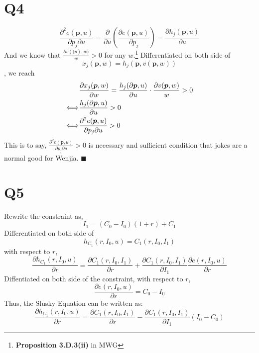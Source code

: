 \documentclass{article}
\begin{document}
\section{Q4}
\begin{equation}
	\frac{\partial^2 e(\bm{p},u)}{\partial p_{j} \partial u} = \frac{\partial}{\partial u}(\frac{\partial e(\bm{p},u)}{\partial p_{j}}) = \frac{\partial h_j(\bm{p},u)}{\partial u}
\end{equation}
And we know that $\frac{\partial v(\bm(p),w)}{w}>0$ for any $w$.\footnote{{\bf Proposition 3.D.3(ii)} in MWG}
Differentiated on both side of 
\begin{equation}
	x_j (\bm{p},w) = h_j (\bm{p}, v(\bm{p},w))
\end{equation}
, we reach
\begin{align}	\notag
	&\frac{\partial x_{j}(\bm{p},w)}{\partial w} = \frac{h_j (\partial \bm{p}, u)}{\partial u}\cdot \frac{\partial v(\bm{p},w)}{w} > 0 \\ \notag
	\Longleftrightarrow &\frac{h_j (\partial \bm{p}, u)}{\partial u}>0 \\ \notag
	\Longleftrightarrow &\frac{\partial^2 e(\bm{p},u)}{\partial p_{j} \partial u} >0
\end{align}
This is to say, $\frac{\partial^2 e(\bm{p},u)}{\partial p_{j} \partial u} >0$ is necessary and sufficient condition that jokes are a normal good for Wenjia. $\blacksquare$

\section{Q5}
Rewrite the constraint as,
\begin{equation}
	I_{1} = (C_{0}-I_{0}) (1+r)+C_1
\end{equation}
Differentiated on both side of 
\begin{equation}
	h_{C_1}(r,I_0,u) = C_1 (r, I_0, I_1)
\end{equation}
with respect to $r$,
\begin{equation}
	\frac{\partial h_{C_1}(r,I_0,u)}{\partial r} =\frac{\partial C_1 (r, I_0, I_1)} {\partial r} + \frac{\partial C_1 (r, I_0, I_1)} {\partial I_1}  \frac{\partial e(r, I_0, u)}{\partial r}
\end{equation}
Diffentiated on both side of the constraint, with respect to $r$,
\begin{equation}
	\frac{\partial e(r, I_0, u)}{\partial r} = C_0 - I_0
\end{equation}
Thus, the Slusky Equation can be written as:
\begin{equation}
	\frac{\partial h_{C_1}(r,I_0,u)}{\partial r} = \frac{\partial C_1 (r, I_0, I_1)} {\partial r} - \frac{\partial C_1 (r, I_0, I_1)} {\partial I_1}  (I_0-C_0)
\end{equation}
\end{document}
